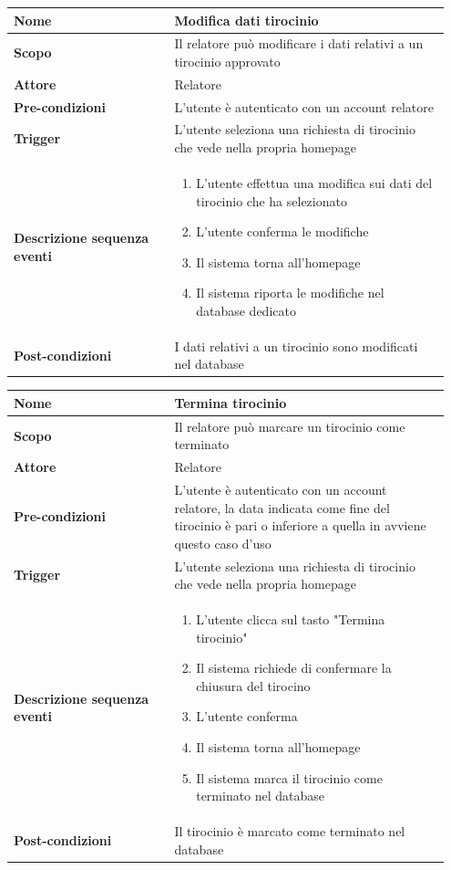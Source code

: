 \documentclass[12pt]{article}
\begin{document}
 \begin{longtable}{|p{0.35\linewidth} | p{0.6\linewidth}|}
 \hline
 \textbf{Nome} & Modifica dati tirocinio \\ \hline
 \textbf{Scopo} & Il relatore può modificare i dati relativi a un tirocinio approvato \\ \hline
  \textbf{Attore} & Relatore \\ \hline
  \textbf{Pre-condizioni} & L'utente è autenticato con un account relatore \\ \hline
  \textbf{Trigger} & L'utente seleziona una richiesta di tirocinio che vede nella propria homepage \\ \hline
  \textbf{Descrizione sequenza eventi} &
  \begin{enumerate}[label=(\arabic*)]
      \item L'utente effettua una modifica sui dati del tirocinio che ha selezionato
      \item L'utente conferma le modifiche
      \item Il sistema torna all'homepage
      \item Il sistema riporta le modifiche nel database dedicato
  \end{enumerate} \\ \hline
  \textbf{Post-condizioni} & I dati relativi a un tirocinio sono modificati nel database \\ \hline
 \end{longtable}

 \begin{longtable}{|p{0.35\linewidth} | p{0.6\linewidth}|}
 \hline
 \textbf{Nome} & Termina tirocinio \\ \hline
 \textbf{Scopo} & Il relatore può marcare un tirocinio come terminato  \\ \hline
  \textbf{Attore} & Relatore \\ \hline
  \textbf{Pre-condizioni} & L'utente è autenticato con un account relatore, la data indicata come fine del tirocinio è pari o inferiore a quella in avviene questo caso d'uso \\ \hline
  \textbf{Trigger} & L'utente seleziona una richiesta di tirocinio che vede nella propria homepage \\ \hline
  \textbf{Descrizione sequenza eventi} &
  \begin{enumerate}[label=(\arabic*)]
      \item L'utente clicca sul tasto "Termina tirocinio"
      \item Il sistema richiede di confermare la chiusura del tirocino
      \item L'utente conferma
      \item Il sistema torna all'homepage
      \item Il sistema marca il tirocinio come terminato nel database
  \end{enumerate} \\ \hline
  \textbf{Post-condizioni} & Il tirocinio è marcato come terminato nel database \\ \hline
 \end{longtable}
\end{document}

